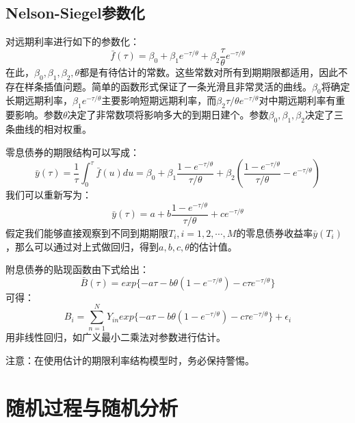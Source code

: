 \documentclass[UTF8]{ctexart}
\begin{document}
\subsection{Nelson-Siegel参数化}
对远期利率进行如下的参数化：
$$\bar f(\tau)=\beta_0+\beta_1 e^{-\tau/\theta} + \beta_2 \frac{\tau}{\theta} e^{-\tau/\theta}$$
在此，$\beta_0,\beta_1,\beta_2,\theta$都是有待估计的常数。这些常数对所有到期期限都适用，因此不存在样条插值问题。简单的函数形式保证了一条光滑且非常灵活的曲线。$\beta_0$将确定长期远期利率，$\beta_1 e^{-\tau/\theta}$主要影响短期远期利率，而$\beta_2 \tau/\theta e^{-\tau/\theta}$对中期远期利率有重要影响。参数$\theta$决定了非常数项将影响多大的到期日建个。参数$\beta_0,\beta_1,\beta_2$决定了三条曲线的相对权重。

零息债券的期限结构可以写成：
$$\bar y(\tau)=\frac{1}{\tau}\int_0^\tau \bar f(u)du=\beta_0+\beta_1 \frac{1-e^{-\tau/\theta}}{\tau/\theta}+\beta_2(\frac{1-e^{-\tau/\theta}}{\tau/\theta}-e^{-\tau/\theta})$$
我们可以重新写为：
$$\bar y(\tau)=a+b\frac{1-e^{-\tau/\theta}}{\tau/\theta}+ce^{-\tau/\theta}$$
假定我们能够直接观察到不同到期期限$T_i,i=1,2,\cdots,M$的零息债券收益率$\bar y(T_i)$，那么可以通过对上式做回归，得到$a,b,c,\theta$的估计值。

附息债券的贴现函数由下式给出：
$$\bar B(\tau)=exp\{-a\tau-b\theta(1-e^{-\tau/\theta})-c\tau e^{-\tau/\theta} \}$$
可得：
$$B_i=\sum\limits_{n=1}^N Y_{in}exp\{-a\tau-b\theta(1-e^{-\tau/\theta})-c\tau e^{-\tau/\theta} \}+\epsilon_i$$
用非线性回归，如广义最小二乘法对参数进行估计。

注意：在使用估计的期限利率结构模型时，务必保持警惕。

\section{随机过程与随机分析}
\end{document}
